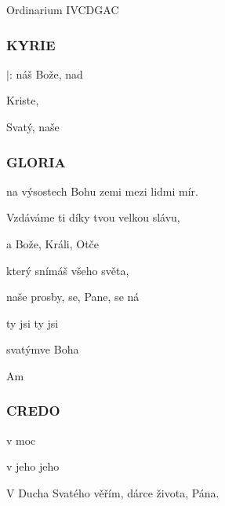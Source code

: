 \begin{song}{Ordinarium IV}{CDGAC}{}

\subsubsection*{KYRIE}
\begin{SBChorus*}
$|$: náš Bože,   nad 

 Kriste,   

 Svatý,  naše   
\end{SBChorus*}
\subsubsection*{GLORIA}
\begin{SBChorus*}

 na výsostech Bohu  zemi mezi lidmi mír.

Vzdáváme ti díky  tvou velkou slávu,

 a Bože,  Králi,  Otče  

 který snímáš  všeho světa,

 naše prosby,  se, Pane,  se  ná 

 ty jsi   ty jsi 

   svatýmve  Boha 

Am  
\end{SBChorus*}


\subsubsection*{CREDO}
\begin{SBVerse}
 v    moc

 v jeho    jeho 
\end{SBVerse}
\begin{SBChorus}
      
\end{SBChorus}
\begin{SBVerse}
V Ducha Svatého věřím, dárce života, Pána.


\end{SBVerse}
\end{song}

